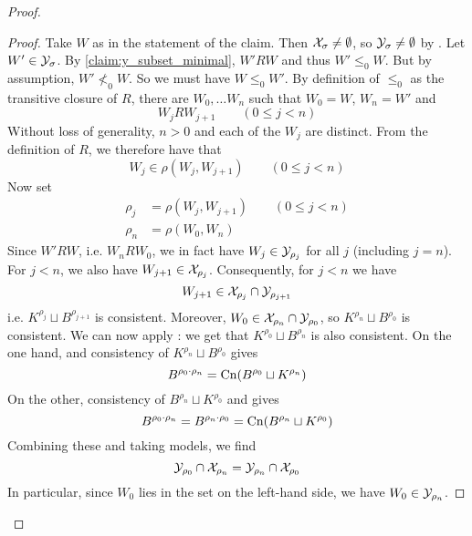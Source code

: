 \begin{proof}
\begin{proof}
        Take $W$ as in the statement of the claim. Then $\mathcal{X}_\sigma \ne
        \emptyset$, so $\mathcal{Y}_\sigma \ne \emptyset$ by
        \condcons{}. Let $W' \in \mathcal{Y}_\sigma$.  By
        \cref{claim:y_subset_minimal}, $W' R W$ and thus $W' \le_0 W$. But by
        assumption, $W' \not<_0 W$. So we must have $W \le_0 W'$. By definition
        of $\le_0$ as the transitive closure of $R$, there are $W_0, \ldots
        W_n$ such that $W_0 = W$, $W_n = W'$ and
        \[
            W_j R W_{j+1} \qquad (0 \le j < n)
        \]
        Without loss of generality, $n > 0$ and each of the $W_j$ are distinct.
        From the definition of $R$, we therefore have that
        \[
            W_j \in \rho(W_j, W_{j+1}) \qquad (0 \le j < n)
        \]
        Now set
        \begin{align*}
            \rho_j &= \rho(W_j, W_{j+1}) \qquad (0 \le j < n) \\
            \rho_n &= \rho(W_0, W_n)
        \end{align*}
        Since $W' R W$, i.e. $W_n R W_0$, we in fact have $W_j \in \mathcal{Y}_{\rho_j}$
        for all $j$ (including $j = n$). For $j < n$, we also have $W_{j+1} \in
        \mathcal{X}_{\rho_j}$.\footnotemark{}
        Consequently, for $j < n$ we have
        \[
            W_{j+1} \in \mathcal{X}_{\rho_j} \cap \mathcal{Y}_{\rho_{j+1}}
        \]
        i.e. $K^{\rho_j} \sqcup B^{\rho_{j+1}}$ is consistent. Moreover, $W_0
        \in \mathcal{X}_{\rho_n} \cap \mathcal{Y}_{\rho_0}$, so $K^{\rho_n} \sqcup B^{\rho_0}$ is
        consistent. We can now apply \acyc{}: we get that $K^{\rho_0}
        \sqcup B^{\rho_n}$ is also consistent. On the one hand,
        \incvac{} and consistency of $K^{\rho_n} \sqcup
        B^{\rho_0}$ gives
        \[
            B^{\rho_0 \cdot \rho_n}
            = \operatorname{Cn}(B^{\rho_0} \sqcup K^{\rho_n})
        \]
        On the other, consistency of $B^{\rho_n} \sqcup K^{\rho_0}$ and
        \rearr{} gives
        \[
            B^{\rho_0 \cdot \rho_n}
            = B^{\rho_n \cdot \rho_0}
            = \operatorname{Cn}(B^{\rho_n} \sqcup K^{\rho_0})
        \]
        Combining these and taking models, we find
        \[
            \mathcal{Y}_{\rho_0} \cap \mathcal{X}_{\rho_n}
            =
            \mathcal{Y}_{\rho_n} \cap \mathcal{X}_{\rho_0}
        \]
        In particular, since $W_0$ lies in the set on the left-hand side, we
        have $W_0 \in \mathcal{Y}_{\rho_n}$.


\end{proof}
\end{proof}

